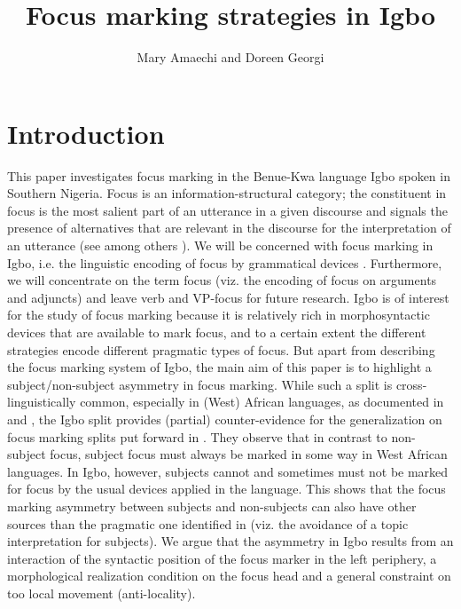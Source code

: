 \documentclass[output=paper,colorlinks,citecolor=brown]{langscibook}
\title{Focus marking strategies in Igbo}
\author{Mary Amaechi\affiliation{University of Potsdam} and Doreen Georgi\affiliation{University of Potsdam}}
\begin{document}
\maketitle 


\section{Introduction}\label{sec:amaechi:1}

This paper investigates focus marking in the Benue-Kwa language Igbo spoken in Southern Nigeria. Focus is an information-structural category; the constituent in focus is the most salient part of an utterance in a given discourse and signals the presence of alternatives that are relevant in the discourse for the interpretation of an utterance (see among others \citealt{Jackendoff1972, Dik1997, Rooth1985, Krifka2008, ZimmermannOnea2011}). We will be concerned with focus marking in Igbo, i.e. the linguistic encoding of focus by grammatical devices \citep{FiedlerEtAl2010}. Furthermore, we will concentrate on the term focus (viz. the encoding of focus on arguments and adjuncts) and leave verb and VP-focus for future research. Igbo is of interest for the study of focus marking because it is relatively rich in  morphosyntactic devices that are available to mark focus, and to a certain extent the different strategies encode different pragmatic types of focus. But apart from describing the focus marking system of Igbo, the main aim of this paper is to highlight a subject\slash non-subject asymmetry in focus marking. While such a split is cross-linguistically common, especially in (West) African languages, as documented in \citet{FiedlerEtAl2010} and \citet{Kalinowski2015}, the Igbo split provides (partial) counter-evidence for the generalization on focus marking splits put forward in \citet{FiedlerEtAl2010}. They observe that in contrast to non-subject focus, subject focus must always be marked in some way in West African languages. In Igbo, however, subjects cannot and sometimes must not be marked for focus by the usual devices applied in the language. This shows that the focus marking asymmetry between subjects and non-subjects can also have other sources than the pragmatic one identified in \citet{FiedlerEtAl2010} (viz. the avoidance of a topic interpretation for subjects). We argue that the asymmetry in Igbo results from an interaction of the syntactic position of the focus marker in the left periphery, a morphological realization condition on the focus head and a general constraint on too local movement (anti-locality).
\end{document}
